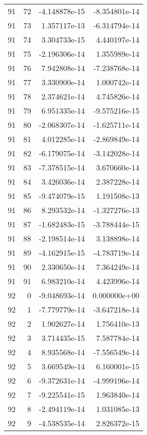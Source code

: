 \begin{tabular}{rrrr}
  91 &   72 & -4.148878e-15 & -8.354801e-14 \\
  91 &   73 &  1.357117e-13 & -6.314794e-14 \\
  91 &   74 &  3.304733e-15 &  4.440197e-14 \\
  91 &   75 & -2.196306e-14 &  1.355989e-14 \\
  91 &   76 &  7.942808e-14 & -7.238768e-14 \\
  91 &   77 &  3.330900e-14 &  1.000742e-14 \\
  91 &   78 &  2.374621e-14 &  4.745826e-14 \\
  91 &   79 &  6.951335e-14 & -9.575216e-15 \\
  91 &   80 & -2.068307e-14 & -1.625711e-14 \\
  91 &   81 &  4.012285e-14 & -2.869849e-14 \\
  91 &   82 & -6.179075e-14 & -3.142028e-14 \\
  91 &   83 & -7.378515e-14 &  3.670660e-14 \\
  91 &   84 &  3.426036e-14 &  2.387228e-14 \\
  91 &   85 & -9.474079e-15 &  1.191508e-13 \\
  91 &   86 &  8.293532e-14 & -1.327276e-13 \\
  91 &   87 & -1.682483e-15 & -3.788444e-15 \\
  91 &   88 & -2.198514e-14 &  3.138898e-14 \\
  91 &   89 & -4.162915e-15 & -4.783719e-14 \\
  91 &   90 &  2.330650e-14 &  7.364249e-14 \\
  91 &   91 &  6.983210e-14 &  4.423996e-14 \\
  92 &    0 & -9.048693e-14 &  0.000000e+00 \\
  92 &    1 & -7.779779e-14 & -3.647218e-14 \\
  92 &    2 &  1.902627e-14 &  1.756410e-13 \\
  92 &    3 &  3.714435e-15 &  7.587784e-14 \\
  92 &    4 &  8.935568e-14 & -7.556549e-14 \\
  92 &    5 &  3.669549e-14 &  6.160001e-15 \\
  92 &    6 & -9.372631e-14 & -4.999196e-14 \\
  92 &    7 & -9.225541e-15 &  1.963840e-14 \\
  92 &    8 & -2.494119e-14 &  1.031085e-13 \\
  92 &    9 & -4.538535e-14 &  2.826372e-15 \\

\end{tabular}
